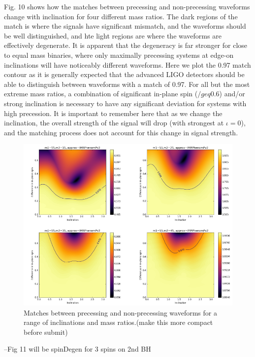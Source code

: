 \documentclass[11pt]{article}
\begin{document}
Fig. 10 shows how the matches between precessing and non-precessing waveforms change with inclination for four different mass ratios. The dark regions of the match is where the signals have significant mismatch, and the waveforms should be well distinguished, and hte light regions are where the waveforms are effectively degenerate. It is apparent that the degeneracy is far stronger for close to equal mass binaries, where only maximally precessing systems at edge-on inclinations will have noticeably different waveforms. Here we plot the 0.97 match contour as it is generally expected that the advanced LIGO detectors should be able to distinguish between waveforms with a match of 0.97. For all but the most extreme mass ratios, a combination of significant in-plane spin ($/geq0.6$) and/or strong inclination is necessary to have any significant deviation for systems with high precession. It is important to remember here that as we change the inclination, the overall strength of the signal will drop (with strongest at $\iota=0$), and the matching process does not account for this change in signal strength.

\begin{figure}[h]
	\includegraphics[scale=0.55]{fig10.png}
	\centering
	\caption{Matches between precessing and non-precessing waveforms for a range of inclinations and mass ratios.(make this more compact before submit)}
	\centering
\end{figure}

--Fig 11 will be spinDegen for 3 spins on 2nd BH
\end{document}
